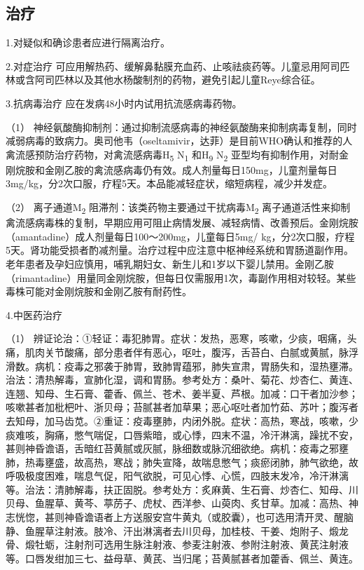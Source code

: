 \subsection{治疗}

1.对疑似和确诊患者应进行隔离治疗。

2.对症治疗
可应用解热药、缓解鼻黏膜充血药、止咳祛痰药等。儿童忌用阿司匹林或含阿司匹林以及其他水杨酸制剂的药物，避免引起儿童Reye综合征。

3.抗病毒治疗 应在发病48小时内试用抗流感病毒药物。

（1）
神经氨酸酶抑制剂：通过抑制流感病毒的神经氨酸酶来抑制病毒复制，同时减弱病毒的致病力。奥司他韦（oseltamivir，达菲）是目前WHO确认和推荐的人禽流感预防治疗药物，对禽流感病毒H\textsubscript{5}
N\textsubscript{1} 和H\textsubscript{9} N\textsubscript{2}
亚型均有抑制作用，对耐金刚烷胺和金刚乙胺的禽流感病毒仍有效。成人剂量每日150mg，儿童剂量每日3mg/kg，分2次口服，疗程5天。本品能减轻症状，缩短病程，减少并发症。

（2） 离子通道M\textsubscript{2}
阻滞剂：该类药物主要通过干扰病毒M\textsubscript{2}
离子通道活性来抑制禽流感病毒株的复制，早期应用可阻止病情发展、减轻病情、改善预后。金刚烷胺（amantadine）成人剂量每日100～200mg，儿童每日5mg/
kg，分2次口服，疗程5天。肾功能受损者酌减剂量。治疗过程中应注意中枢神经系统和胃肠道副作用。老年患者及孕妇应慎用，哺乳期妇女、新生儿和1岁以下婴儿禁用。金刚乙胺（rimantadine）用量同金刚烷胺，但每日仅需服用1次，毒副作用相对较轻。某些毒株可能对金刚烷胺和金刚乙胺有耐药性。

4.中医药治疗

（1）
辨证论治：①轻证：毒犯肺胃。症状：发热，恶寒，咳嗽，少痰，咽痛，头痛，肌肉关节酸痛，部分患者伴有恶心，呕吐，腹泻，舌苔白、白腻或黄腻，脉浮滑数。病机：疫毒之邪袭于肺胃，致肺胃蕴邪，肺失宣肃，胃肠失和，湿热壅滞。治法：清热解毒，宣肺化湿，调和胃肠。参考处方：桑叶、菊花、炒杏仁、黄连、连翘、知母、生石膏、藿香、佩兰、苍术、姜半夏、芦根。加减：口干者加沙参；咳嗽甚者加枇杷叶、浙贝母；苔腻甚者加草果；恶心呕吐者加竹茹、苏叶；腹泻者去知母，加马齿苋。②重证：疫毒壅肺，内闭外脱。症状：高热，寒战，咳嗽，少痰难咳，胸痛，憋气喘促，口唇紫暗，或心悸，四末不温，冷汗淋漓，躁扰不安，甚则神昏谵语，舌暗红苔黄腻或灰腻，脉细数或脉沉细欲绝。病机：疫毒之邪壅肺，热毒壅盛，故高热，寒战；肺失宣降，故喘息憋气；痰瘀闭肺，肺气欲绝，故呼吸极度困难，喘息气促，阳气欲脱，可见心悸、心慌，四肢末发冷，冷汗淋漓等。治法：清肺解毒，扶正固脱。参考处方：炙麻黄、生石膏、炒杏仁、知母、川贝母、鱼腥草、黄芩、葶苈子、虎杖、西洋参、山萸肉、炙甘草。加减：高热、神志恍惚，甚则神昏谵语者上方送服安宫牛黄丸（或胶囊），也可选用清开灵、醒脑静、鱼腥草注射液。肢冷、汗出淋漓者去川贝母，加桂枝、干姜、炮附子、煅龙骨、煅牡蛎，注射剂可选用生脉注射液、参麦注射液、参附注射液、黄芪注射液等。口唇发绀加三七、益母草、黄芪、当归尾；苔黄腻甚者加藿香、佩兰、黄连。

